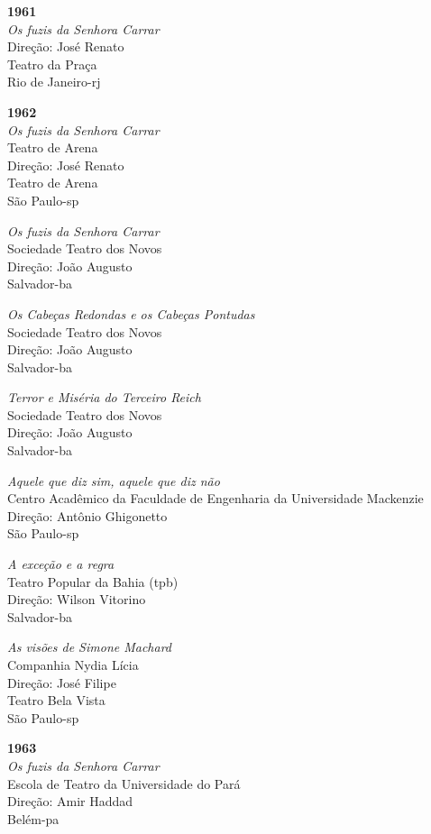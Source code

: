 \item{\bf 1961}\\
{\it Os fuzis da Senhora Carrar}\\
Direção: José Renato\\
Teatro da Praça\\
Rio de Janeiro-{\sc rj}

\item{\bf 1962}\\
{\it Os fuzis da Senhora Carrar}\\
Teatro de Arena\\
Direção: José Renato\\
Teatro de Arena\\
São Paulo-{\sc sp}

{\it Os fuzis da Senhora Carrar}\\
Sociedade Teatro dos Novos\\
Direção: João Augusto\\
Salvador-{\sc ba}

{\it Os Cabeças Redondas e os Cabeças Pontudas}\\
Sociedade Teatro dos Novos\\
Direção: João Augusto\\
Salvador-{\sc ba}

{\it Terror e Miséria do Terceiro Reich}\\
Sociedade Teatro dos Novos\\
Direção: João Augusto\\
Salvador-{\sc ba}

{\it Aquele que diz sim, aquele que diz não}\\
Centro Acadêmico da Faculdade de Engenharia da Universidade Mackenzie\\
Direção: Antônio Ghigonetto\\
São Paulo-{\sc sp}

{\it A exceção e a regra}\\
Teatro Popular da Bahia ({\sc tpb})\\
Direção: Wilson Vitorino\\
Salvador-{\sc ba}

{\it As visões de Simone Machard}\\
Companhia Nydia Lícia\\
Direção: José Filipe\\
Teatro Bela Vista\\
São Paulo-{\sc sp}

\item{\bf 1963}\\
{\it Os fuzis da Senhora Carrar}\\
Escola de Teatro da Universidade do Pará\\
Direção: Amir Haddad\\
Belém-{\sc pa}

